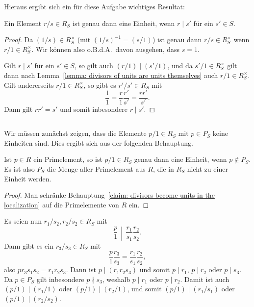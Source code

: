 \documentclass[a4paper,10pt,numbers=noenddot]{scrartcl}
\begin{document}
Hieraus ergibt sich ein für diese Aufgabe wichtiges Resultat:

\begin{claim}
  \label{claim: divisors become units in the localization}
  Ein Element $r/s \in R_S$ ist genau dann eine Einheit, wenn $r \mid s'$ für ein $s' \in S$.
\end{claim}
\begin{proof}
  Da $(1/s) \in R_S^{\times}$ (mit $(1/s)^{-1} = (s/1)$) ist genau dann $r/s \in R_S^\times$ wenn $r/1 \in R_S^\times$.
  Wir können also o.B.d.A.\ davon ausgehen, dass $s = 1$.
  
  Gilt $r \mid s'$ für ein $s' \in S$, so gilt auch $(r/1) \mid (s'/1)$, und da $s'/1 \in R_S^{\times}$ gilt dann nach Lemma~\ref{lemma: divisors of units are units themselves} auch $r/1 \in R_S^{\times}$.
  Gilt andererseits $r/1 \in R_S^\times$, so gibt es $r'/s' \in R_S$ mit
  \[
      \frac{1}{1}
    = \frac{r}{1} \frac{r'}{s'}
    = \frac{r r'}{s'}.
  \]
  Dann gilt $r r' = s'$ und somit inbesondere $r \mid s'$.
\end{proof}


\begin{remark}
\end{remark}





\subsection{}

Wir müssen zunächst zeigen, dass die Elemente $p/1 \in R_S$ mit $p \in P_S$ keine Einheiten sind.
Dies ergibt sich aus der folgenden Behauptung.

\begin{claim}
  \label{claim: prime elements which become units in the localization}
  Ist $p \in R$ ein Primelement, so ist $p/1 \in R_S$ genau dann eine Einheit, wenn $p \notin P_S$.
  Es ist also $P_S$ die Menge aller Primelement aus $R$, die in $R_S$ nicht zu einer Einheit werden.
\end{claim}

\begin{proof}
  Man schränke Behauptung~\ref{claim: divisors become units in the localization} auf die Primelemente von $R$ ein.
\end{proof}

Es seien nun $r_1/s_2, r_2/s_2 \in R_S$ mit
\[
  \left. \frac{p}{1} \,\middle|\, \frac{r_1}{s_1} \frac{r_2}{s_2} \right..
\]
Dann gibt es ein $r_3/s_3 \in R_S$ mit
\[
    \frac{p}{1} \frac{r_3}{s_3}
  = \frac{r_1}{s_1} \frac{r_2}{s_2},
\]
also $p r_3 s_1 s_2 = r_1 r_2 s_3$.
Dann ist $p \mid (r_1 r_2 s_3)$ und somit $p \mid r_1$, $p \mid r_2$ oder $p \mid s_3$.
Da $p \in P_S$ gilt inbesondere $p \nmid s_3$, weshalb $p \mid r_1$ oder $p \mid r_2$.
Damit ist auch $(p/1) \mid (r_1/1)$ oder $(p/1) \mid (r_2/1)$, und somit $(p/1) \mid (r_1/s_1)$ oder $(p/1) \mid (r_2/s_2)$.
\end{document}
